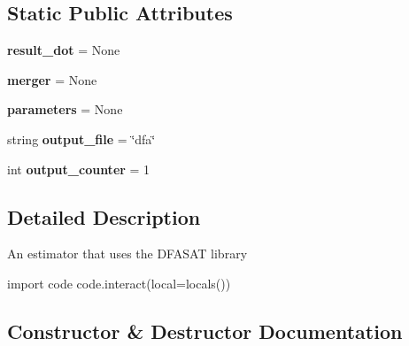 \subsection*{Static Public Attributes}
\begin{DoxyCompactItemize}
\item 
{\bfseries result\+\_\+dot} = None\hypertarget{classflexfringe_1_1estimators_1_1_d_f_a_s_a_t_estimator_a1e9d8682efb59491ffa795bd7d5d71f3}{}\label{classflexfringe_1_1estimators_1_1_d_f_a_s_a_t_estimator_a1e9d8682efb59491ffa795bd7d5d71f3}

\item 
{\bfseries merger} = None\hypertarget{classflexfringe_1_1estimators_1_1_d_f_a_s_a_t_estimator_a0dfe48ef75b61a30a409c44b81d9ae69}{}\label{classflexfringe_1_1estimators_1_1_d_f_a_s_a_t_estimator_a0dfe48ef75b61a30a409c44b81d9ae69}

\item 
{\bfseries parameters} = None\hypertarget{classflexfringe_1_1estimators_1_1_d_f_a_s_a_t_estimator_a7866efef58da465d38437786d661bb7c}{}\label{classflexfringe_1_1estimators_1_1_d_f_a_s_a_t_estimator_a7866efef58da465d38437786d661bb7c}

\item 
string {\bfseries output\+\_\+file} = \char`\"{}dfa\char`\"{}\hypertarget{classflexfringe_1_1estimators_1_1_d_f_a_s_a_t_estimator_ab3f59e51cce085b26cbaf0ae53d34c74}{}\label{classflexfringe_1_1estimators_1_1_d_f_a_s_a_t_estimator_ab3f59e51cce085b26cbaf0ae53d34c74}

\item 
int {\bfseries output\+\_\+counter} = 1\hypertarget{classflexfringe_1_1estimators_1_1_d_f_a_s_a_t_estimator_abe53fa245c01d3427748cb33d1e0a06e}{}\label{classflexfringe_1_1estimators_1_1_d_f_a_s_a_t_estimator_abe53fa245c01d3427748cb33d1e0a06e}

\end{DoxyCompactItemize}


\subsection{Detailed Description}
\begin{DoxyVerb}An estimator that uses the DFASAT library

   import code
   code.interact(local=locals())\end{DoxyVerb}
 

\subsection{Constructor \& Destructor Documentation}
